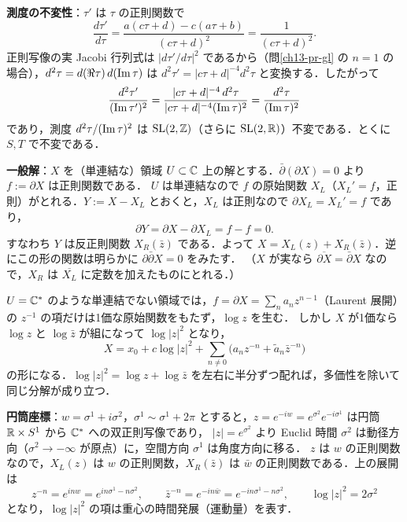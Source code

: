 \textbf{測度の不変性}：$\tau'$ は $\tau$ の正則関数で
\begin{equation*}
  \frac{d\tau'}{d\tau} = \frac{a(c\tau+d)-c(a\tau+b)}{(c\tau+d)^2} = \frac{1}{(c\tau+d)^2}.
\end{equation*}
正則写像の実 Jacobi 行列式は $|d\tau'/d\tau|^2$ であるから（問\ref{ch13-pr-gl} の $n=1$ の場合），$d^2\tau=d(\Re\tau)\,d(\operatorname{Im}\tau)$ は
$d^2\tau' = |c\tau+d|^{-4}d^2\tau$ と変換する．したがって
\begin{equation*}
  \frac{d^2\tau'}{(\operatorname{Im}\tau')^2} = \frac{|c\tau+d|^{-4}\,d^2\tau}{|c\tau+d|^{-4}(\operatorname{Im}\tau)^2} = \frac{d^2\tau}{(\operatorname{Im}\tau)^2}
\end{equation*}
であり，測度 $d^2\tau/(\operatorname{Im}\tau)^2$ は $\operatorname{SL}(2,\mathbb{Z})$（さらに $\operatorname{SL}(2,\mathbb{R})$）不変である．とくに $S,T$ で不変である．

\textbf{一般解}：$X$ を（単連結な）領域 $U\subset\mathbb{C}$ 上の解とする．$\bar\partial(\partial X)=0$ より $f:=\partial X$ は正則関数である．
$U$ は単連結なので $f$ の原始関数 $X_L$（$X_L'=f$，正則）がとれる．$Y:=X-X_L$ とおくと，$X_L$ は正則なので $\partial X_L = X_L' = f$ であり，
\begin{equation*}
  \partial Y = \partial X - \partial X_L = f - f = 0 .
\end{equation*}
すなわち $Y$ は反正則関数 $X_R(\bar z)$ である．よって $X=X_L(z)+X_R(\bar z)$．逆にこの形の関数は明らかに $\partial\bar\partial X=0$ をみたす．
（$X$ が実なら $\overline{\partial X}=\bar\partial X$ なので，$X_R$ は $\overline{X_L}$ に定数を加えたものにとれる．）

$U=\mathbb{C}^*$ のような単連結でない領域では，$f=\partial X=\sum_n a_nz^{n-1}$（Laurent 展開）の $z^{-1}$ の項だけは1価な原始関数をもたず，$\log z$ を生む．
しかし $X$ が1価なら $\log z$ と $\log\bar z$ が組になって $\log|z|^2$ となり，
\begin{equation*}
  X = x_0 + c\log|z|^2 + \sum_{n\neq0}\bigl(a_nz^{-n}+\tilde a_n\bar z^{-n}\bigr)
\end{equation*}
の形になる．$\log|z|^2=\log z+\log\bar z$ を左右に半分ずつ配れば，多価性を除いて同じ分解が成り立つ．

\textbf{円筒座標}：$w=\sigma^1+i\sigma^2$，$\sigma^1\sim\sigma^1+2\pi$ とすると，$z=e^{-iw}=e^{\sigma^2}e^{-i\sigma^1}$ は円筒 $\mathbb{R}\times S^1$ から $\mathbb{C}^*$ への双正則写像であり，
$|z|=e^{\sigma^2}$ より Euclid 時間 $\sigma^2$ は動径方向（$\sigma^2\to-\infty$ が原点）に，空間方向 $\sigma^1$ は角度方向に移る．
$z$ は $w$ の正則関数なので，$X_L(z)$ は $w$ の正則関数，$X_R(\bar z)$ は $\bar w$ の正則関数である．上の展開は
\begin{equation*}
  z^{-n}=e^{in w}=e^{in\sigma^1-n\sigma^2},\qquad \bar z^{-n}=e^{-in\bar w}=e^{-in\sigma^1-n\sigma^2},\qquad \log|z|^2=2\sigma^2
\end{equation*}
となり，$\log|z|^2$ の項は重心の時間発展（運動量）を表す．

